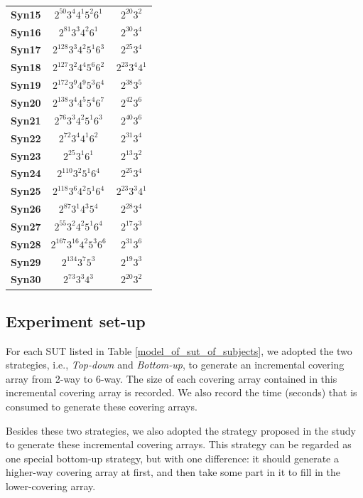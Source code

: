 \documentclass[conference]{IEEEtran}
\theoremstyle{definition}
\begin{document}
\begin{table}[!ht]
\begin{tabular}{|c|c|c|}
    \textbf{Syn15} & $2^{50}3^{4}4^{1}5^{2}6^{1}$ & $2^{20}3^{2}$ \\
    \textbf{Syn16} & $2^{81}3^{3}4^{2}6^{1}$ & $2^{30}3^{4}$\\
    \textbf{Syn17} & $2^{128}3^{3}4^{2}5^{1}6^{3}$ & $2^{25}3^{4}$ \\
    \textbf{Syn18} & $2^{127}3^{2}4^{4}5^{6}6^{2}$ & $2^{23}3^{4}4^{1}$ \\
    \textbf{Syn19} & $2^{172}3^{9}4^{9}5^{3}6^{4}$ & $2^{38}3^{5}$\\
    \textbf{Syn20} & $2^{138}3^{4}4^{5}5^{4}6^{7}$ & $2^{42}3^{6}$ \\
    \textbf{Syn21} & $2^{76}3^{3}4^{2}5^{1}6^{3}$ & $2^{40}3^{6}$ \\
    \textbf{Syn22} & $2^{72}3^{4}4^{1}6^{2}$ & $2^{31}3^{4}$\\
    \textbf{Syn23} & $2^{25}3^{1}6^{1}$ & $2^{13}3^{2}$ \\
    \textbf{Syn24} & $2^{110}3^{2}5^{1}6^{4}$ & $2^{25}3^{4}$ \\
    \textbf{Syn25} & $2^{118}3^{6}4^{2}5^{1}6^{4}$ & $2^{23}3^{3}4^{1}$ \\
    \textbf{Syn26} & $2^{87}3^{1}4^{3}5^{4}$ & $2^{28}3^{4}$ \\
    \textbf{Syn27} & $2^{55}3^{2}4^{2}5^{1}6^{4}$ & $2^{17}3^{3}$  \\
    \textbf{Syn28} & $2^{167}3^{16}4^{2}5^{3}6^{6}$ & $2^{31}3^{6}$ \\
    \textbf{Syn29} & $2^{134}3^{7}5^{3}$ & $2^{19}3^{3}$ \\
    \textbf{Syn30} & $2^{73}3^{3}4^{3}$ & $2^{20}3^{2}$ \\
    \hline
    \end{tabular}%
  \end{table}





\subsection{Experiment set-up}
For each SUT listed in Table \ref{model_of_sut_of_subjects}, we adopted the two strategies, i.e., \emph{Top-down} and \emph{Bottom-up}, to generate an incremental covering array from 2-way to 6-way. The size of each covering array contained in this  incremental covering array is recorded. We also record the time (seconds) that is consumed to generate these covering arrays.

Besides these two strategies, we also adopted the strategy proposed in the study \cite{fouche2009incremental} to generate these incremental covering arrays. This strategy can be regarded as one special bottom-up strategy, but with one difference: it should generate a higher-way covering array at first, and then take some part in it to fill in the lower-covering array.
\end{document}
